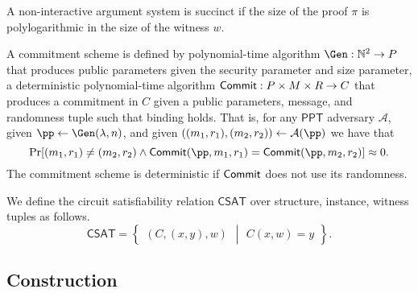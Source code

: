 \begin{definition}[Succinctness]
   A non-interactive argument system is succinct if the size of the proof $\pi$
   is polylogarithmic in the size of the witness $w$.
\end{definition}

\begin{definition}\label{def:commitment}
   A commitment scheme is defined by polynomial-time algorithm
   $\Gen : \mathbb{N}^2 \to P$
   that produces public parameters given the security parameter and size parameter, 
   a deterministic polynomial-time algorithm
   $\mathsf{Commit} : P \times M \times R \to C$
   that produces a commitment in $C$ given a public parameters, message, and randomness tuple
   such that 
   binding holds.
   That is, 
   for any $\mathsf{PPT}$ adversary $\mathcal{A}$,
   given
   $\pp \gets \Gen(\lambda, n)$,
   and given $((m_1, r_1), (m_2, r_2)) \gets \mathcal{A}(\pp)$
   we have that
   \[
       \Pr[(m_1, r_1) \neq (m_2, r_2) \land \Commit(\pp, m_1, r_1) = \Commit(\pp, m_2, r_2)] \approx 0.
   \]
   The commitment scheme is deterministic if $\mathsf{Commit}$ does not use its randomness. 
 \end{definition}

 \begin{definition}
   We define the circuit satisfiability relation $\mathsf{CSAT}$
   over structure, instance, witness tuples
   as follows.
   \begin{equation*}
     \mathsf{CSAT}
     = 
     \left\{
     \begin{array}{l}
         (C, (x, y), w)
     \end{array}
     \middle\vert
     \begin{array}{l}
         C(x, w) = y
     \end{array}
     \right\}.
   \end{equation*}  
 \end{definition}

\subsection{Construction}


